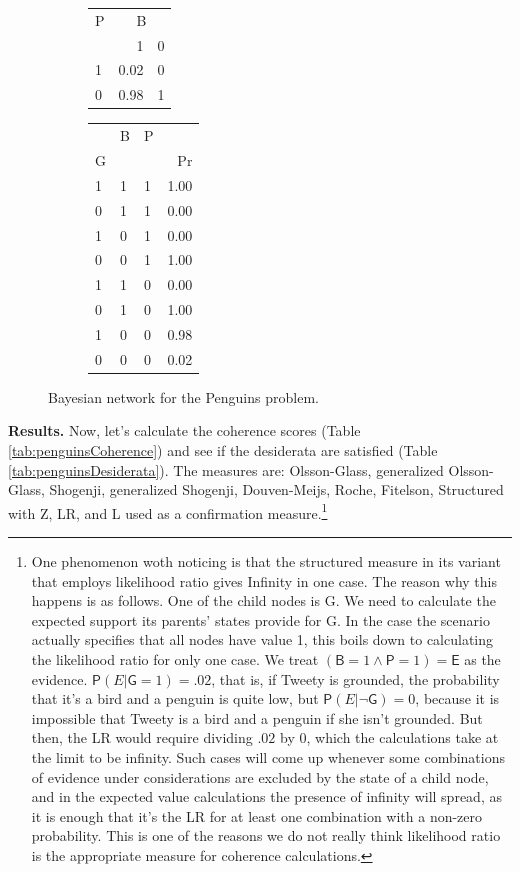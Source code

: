 \documentclass[
  10pt,
]{scrartcl}
\newcommand{\s}[1]{\textsf{#1}}
\newcommand{\pr}[1]{\mathsf{P}(#1)}
\begin{document}
\begin{figure}[H]
{\begin{subfigure}[!ht]{0.4\textwidth}
\begin{tabular}{lrr}
\toprule
\multicolumn{1}{c}{P} & \multicolumn{2}{c}{B} \\
  & 1 & 0\\
\midrule
1 & 0.02 & 0\\
0 & 0.98 & 1\\
\bottomrule
\end{tabular}


\begin{tabular}{lllr}
\toprule
\multicolumn{1}{c}{} & \multicolumn{1}{c}{B} & \multicolumn{1}{c}{P} & \multicolumn{1}{c}{} \\
G &  &  & Pr\\
\midrule
1 & 1 & 1 & 1.00\\
0 & 1 & 1 & 0.00\\
1 & 0 & 1 & 0.00\\
0 & 0 & 1 & 1.00\\
1 & 1 & 0 & 0.00\\
0 & 1 & 0 & 1.00\\
1 & 0 & 0 & 0.98\\
0 & 0 & 0 & 0.02\\
\bottomrule
\end{tabular}
\end{subfigure}}
\caption{Bayesian network for the Penguins problem.}
\label{fig:BGP}
\end{figure}

\noindent \textbf{Results.} Now, let's calculate the coherence scores (Table \ref{tab:penguinsCoherence}) and see if the desiderata are satisfied (Table \ref{tab:penguinsDesiderata}). The measures are: Olsson-Glass, generalized Olsson-Glass, Shogenji, generalized Shogenji, Douven-Meijs, Roche, Fitelson, Structured with Z, LR, and L used as a confirmation measure.\footnote{One phenomenon woth noticing is that the structured measure in its variant that employs likelihood ratio gives \s{Infinity} in one case. The reason why this happens is as follows. One of the child nodes is \s{G}. We need to calculate the expected support its parents' states provide for \s{G}. In the case the scenario actually specifies that all nodes have value 1, this boils down to calculating the likelihood ratio for only one case. We treat \((\s{B} = 1 \wedge \s{P} = 1)=\s{E}\) as the evidence. \(\pr{E \vert \s{G} =1} = .02\), that is, if Tweety is grounded, the probability that it's a bird and a penguin is quite low, but \(\pr{E \vert \neg \s{G}} = 0\), because it is impossible that Tweety is a bird and a penguin if she isn't grounded. But then, the LR would require dividing \(.02\) by \(0\), which the calculations take at the limit to be infinity. Such cases will come up whenever some combinations of evidence under considerations are excluded by the state of a child node, and in the expected value calculations the presence of infinity will spread, as it is enough that it's the LR for at least one combination with a non-zero probability. This is one of the reasons we do not really think likelihood ratio is the appropriate measure for coherence calculations.}
\end{document}

